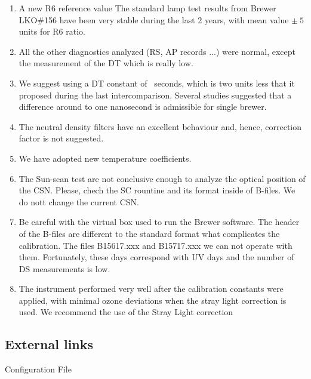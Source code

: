 \begin{enumerate}%

	\item A new R6 reference value The standard lamp test results from Brewer LKO\#156 have been very stable during the last 2 years, with mean value \textbf{\slrefOLD}$\pm\ 5$ units for R6 ratio. 
	
	\item All the other diagnostics analyzed (RS, AP records ...) were normal, except the measurement of the DT which is really low.

	\item  We suggest using a DT constant of \textbf{\DTdef}\ seconds, which is two units less that it proposed during the last intercomparison. Several studies suggested that a difference around to one nanosecond is admissible for single brewer. 

  \item The neutral density filters have an excellent behaviour and, hence, correction factor is not suggested.
		
	\item We have adopted new temperature coefficients. 
	
	\item The Sun-scan test are not conclusive enough to analyze the optical position of the CSN. Please, chech the SC rountine and its format inside of B-files. We do nott change the current CSN. 
	
	\item Be careful with the virtual box used to run the Brewer software. The header of the B-files are different to the standard format what complicates the calibration. The files B15617.xxx and B15717.xxx we can not operate with them. Fortunately, these days correspond with UV days and the number of DS measurements is low. 
	
	\item The instrument performed very well after the calibration constants were applied, with minimal ozone deviations when the stray light correction is used. We recommend the use of the Stray Light correction 
	
\end{enumerate}

\subsection{External links}

Configuration File

